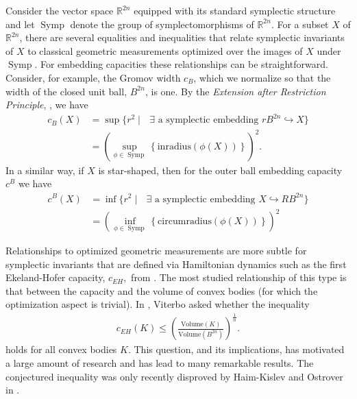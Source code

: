 \documentclass[12pt]{amsart}
\theoremstyle{definition}
\newcommand\Symp{\operatorname{Symp}}
\newcommand{\RR}{{\mathbb R}}
\newcommand{\V}{{\mathrm {Volume}}}
\begin{document}
 Consider the vector space $\RR^{2n}$ equipped with its standard symplectic structure and let $\Symp$ denote the group of symplectomorphisms of $\RR^{2n}$. For a subset $X$ of $\RR^{2n}$, there are several equalities and inequalities that relate symplectic invariants of $X$ to classical geometric measurements optimized over the images of $X$ under $\Symp$. For embedding capacities these relationships can be straightforward. Consider, for example, the Gromov width $c_B$, which we normalize so that the width of the closed unit ball, $B^{2n}$, is one. By the {\em Extension after Restriction Principle}, \cite{eh1,schl}, we have
\begin{align*}
    c_B(X) &= \sup \{ r^2 \mid \text{ $\exists$ a symplectic embedding } r B^{2n} \hookrightarrow X \} \\
    &= \left(\sup_{\phi \in \Symp} \left\{\mathrm{inradius}(\phi(X))\right\}\right)^2.
\end{align*}
In a similar way, if $X$ is star-shaped, then for the outer ball embedding capacity $c^B$ we have 
\begin{align*}
    c^B(X) &= \inf \{ r^2 \mid \text{ $\exists$ a symplectic embedding }  X \hookrightarrow RB^{2n}\} \\
    &= \left(\inf_{\phi \in \Symp} \left\{\mathrm{circumradius}(\phi(X))\right\}\right)^2
\end{align*}
 
Relationships to optimized geometric measurements are more subtle for symplectic invariants that are defined via Hamiltonian dynamics such as the first Ekeland-Hofer capacity, $c_{EH},$ from \cite{eh1}. The most studied relationship of this type is that between the capacity and the volume of convex bodies (for which the optimization aspect is trivial). In \cite{vit}, Viterbo asked whether the inequality 
\begin{align}\label{vit}
    c_{EH}(K) \leq \left(\frac{\V(K)}{\V(B^{2n})}\right)^{\frac{1}{n}}.
\end{align}
holds for all convex bodies $K$. This question, and its implications, has motivated a large amount of research and has lead to many remarkable results. The conjectured inequality was only recently disproved by Haim-Kislev and Ostrover in \cite{hko}.
\end{document}
